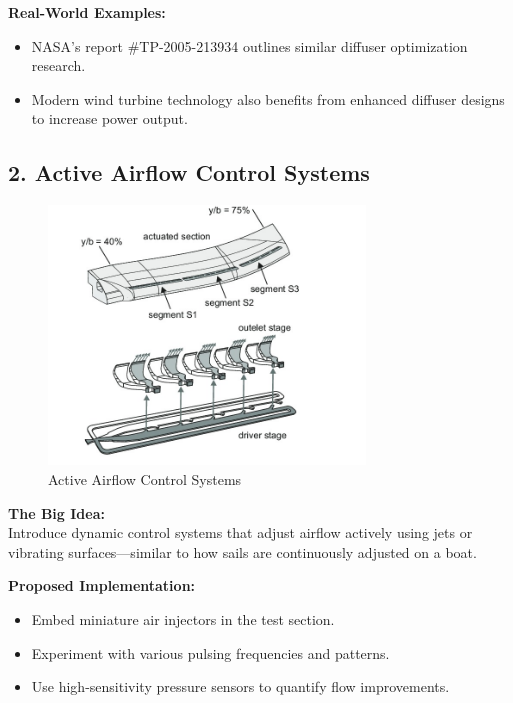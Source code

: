 \documentclass[12pt,a4paper]{article}
\begin{document}
\vspace{0.5em}

\textbf{Real-World Examples:}
\begin{itemize}
    \item NASA's report \#TP-2005-213934 outlines similar diffuser optimization research.
    \item Modern wind turbine technology also benefits from enhanced diffuser designs to increase power output.
\end{itemize}

\vspace{1em}

\subsection*{2. Active Airflow Control Systems}

\begin{figure}[h!]
    \centering
    \includegraphics[width=0.75\textwidth]{image1.jpg}
    \caption{Active Airflow Control Systems}
    \label{fig:comp_map}
\end{figure}

\textbf{The Big Idea:} \\
Introduce dynamic control systems that adjust airflow actively using jets or vibrating surfaces—similar to how sails are continuously adjusted on a boat.

\vspace{0.5em}

\textbf{Proposed Implementation:}
\begin{itemize}
    \item Embed miniature air injectors in the test section.
    \item Experiment with various pulsing frequencies and patterns.
    \item Use high-sensitivity pressure sensors to quantify flow improvements.
\end{itemize}
\end{document}
